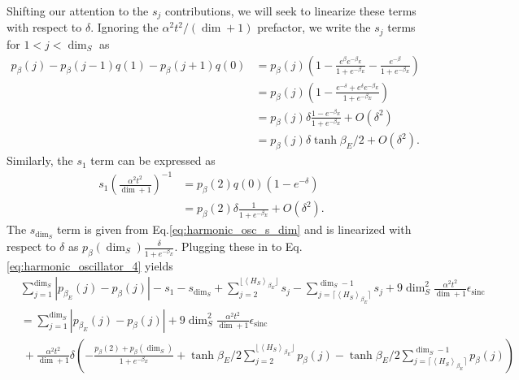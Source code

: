 \documentclass{article}
\newcommand{\parens}[1]{\left( #1 \right)}
\newcommand{\anglebrackets}[1]{\left< #1 \right>}
\newcommand{\bigo}[1]{O\left( #1 \right)}
\DeclareMathOperator{\sinc}{sinc}
\begin{document}
Shifting our attention to the $s_j$ contributions, we will seek to linearize these terms with respect to $\delta$. Ignoring the $\alpha^2 t^2/(\dim + 1)$ prefactor, we write the $s_j$ terms for $1 < j < \dim_S$ as
\begin{align}
    p_{\beta}(j) - p_{\beta}(j - 1) q(1) - p_{\beta}(j + 1) q(0) &= p_{\beta}(j) \parens{1 - \frac{e^\beta e^{-\beta_E}}{1 + e^{-\beta_E}} - \frac{e^{-\beta}}{1 + e^{-\beta_E}}} \\
    &= p_{\beta}(j) \parens{1 - \frac{e^{-\delta} + e^{\delta} e^{-\beta_E}}{1 + e^{-\beta_E}}} \\
    &= p_{\beta}(j) \delta \frac{1 - e^{-\beta_E}}{1 + e^{-\beta_E}} + \bigo{\delta^2} \\
    &= p_{\beta}(j) \delta \tanh{\beta_E / 2} + \bigo{\delta^2} .
\end{align}
Similarly, the $s_1$ term can be expressed as
\begin{align}
    s_1 \parens{\frac{\alpha^2 t^2}{\dim + 1}}^{-1} &= p_{\beta}(2) q(0) (1-e^{-\delta}) \\
    &= p_{\beta}(2) \delta \frac{1}{1 + e^{-\beta_E}} + \bigo{\delta^2}. 
\end{align}
The $s_{\dim_S}$ term is given from Eq.\eqref{eq:harmonic_osc_s_dim} and is linearized with respect to $\delta$ as $p_{\beta}(\dim_S) \frac{\delta}{1 + e^{-\beta_E}}$. Plugging these in to Eq. \eqref{eq:harmonic_oscillator_4} yields 
\begin{align}
    &\sum_{j=1}^{\dim_S} |p_{\beta_E}(j) - p_{\beta}(j)| - s_1 - s_{\dim_S} + \sum_{j = 2}^{\lfloor \anglebrackets{H_S}_{\beta_E} \rfloor} s_j - \sum_{j = \lceil \anglebrackets{H_S}_{\beta_E} \rceil}^{\dim_S - 1} s_j + 9 \dim_S^2 \frac{\alpha^2 t^2}{\dim + 1} \epsilon_{\sinc} \\
    &= \sum_{j=1}^{\dim_S} |p_{\beta_E}(j) - p_{\beta}(j)|  + 9 \dim_S^2 \frac{\alpha^2 t^2}{\dim + 1} \epsilon_{\sinc} \nonumber \\
    &~+ \frac{\alpha^2 t^2}{\dim + 1}  \delta \left( - \frac{p_{\beta}(2) + p_{\beta}(\dim_S)}{1 + e^{-\beta_E}} + \tanh{\beta_E / 2} \sum_{j = 2}^{\lfloor \anglebrackets{H_S}_{\beta_E} \rfloor} p_{\beta}(j) - \tanh{\beta_E / 2} \sum_{j = \lceil \anglebrackets{H_S}_{\beta_E} \rceil}^{\dim_S - 1} p_{\beta}(j) \right)
    \end{align}
\end{document}
